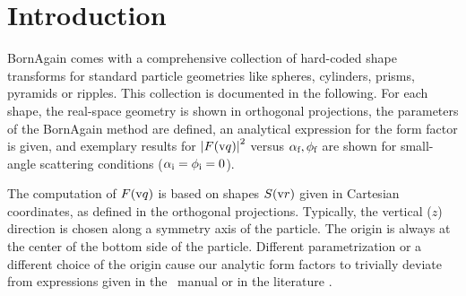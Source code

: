 
\def\ffsection#1{%
\FloatBarrier\clearpage
\section{#1}}

\makeatletter
\renewcommand{\@thesubfigure}{\relax}
\makeatother


\chapter{Introduction}\label{SPFF}

BornAgain comes with a comprehensive collection of hard-coded shape transforms
%
for standard particle geometries like
spheres, cylinders, prisms, pyramids or ripples.
This collection is documented in the following.
For each shape,
the real-space geometry is shown in orthogonal projections,
the parameters of the BornAgain method are defined,
an analytical expression for the form factor is given,
and exemplary results for $\left|F(\q)\right|^2$ versus
$\alpha_\sf,\phi_\sf$ are shown for small-angle scattering conditions
($\alpha_\si=\phi_\si=0$).

The computation of $F(\q)$ is based on
shapes $S(\r)$ given in Cartesian coordinates,
as defined in the orthogonal projections.
Typically, the vertical ($z$) direction is chosen
along a symmetry axis of the particle.
The origin is always at the center of the bottom side of the particle.
Different parametrization or a different choice of the origin
cause our analytic form factors to trivially deviate
from expressions given in the \IsGISAXS\ manual \cite[Sec.~2.3]{Laz06}
or in the literature \cite[Appendix]{ReLL09}.

